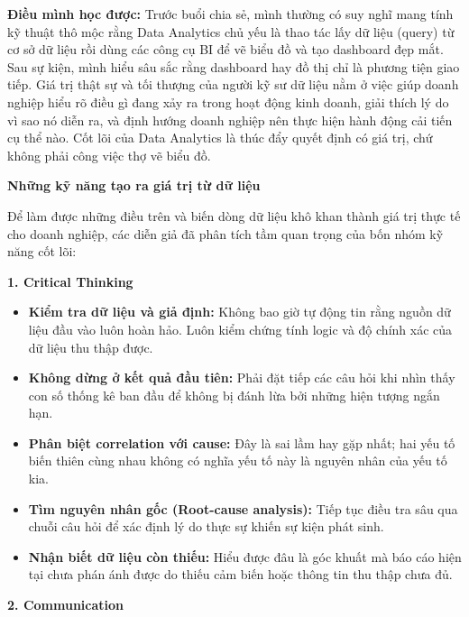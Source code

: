 \textbf{Điều mình học được:} Trước buổi chia sẻ, mình thường có suy nghĩ
mang tính kỹ thuật thô mộc rằng Data Analytics chủ yếu là thao tác lấy
dữ liệu (query) từ cơ sở dữ liệu rồi dùng các công cụ BI để vẽ biểu đồ
và tạo dashboard đẹp mắt. Sau sự kiện, mình hiểu sâu sắc rằng dashboard
hay đồ thị chỉ là phương tiện giao tiếp. Giá trị thật sự và tối thượng
của người kỹ sư dữ liệu nằm ở việc giúp doanh nghiệp hiểu rõ điều gì
đang xảy ra trong hoạt động kinh doanh, giải thích lý do vì sao nó diễn
ra, và định hướng doanh nghiệp nên thực hiện hành động cải tiến cụ thể
nào. Cốt lõi của Data Analytics là thúc đẩy quyết định có giá trị, chứ
không phải công việc thợ vẽ biểu đồ.

\vspace{0.5em}\noindent\textbf{Những kỹ năng tạo ra giá trị từ dữ
liệu}\par

Để làm được những điều trên và biến dòng dữ liệu khô khan thành giá trị
thực tế cho doanh nghiệp, các diễn giả đã phân tích tầm quan trọng của
bốn nhóm kỹ năng cốt lõi:

\vspace{0.5em}\noindent\textbf{1. Critical Thinking}\par

\begin{itemize}
\tightlist
\item
  \textbf{Kiểm tra dữ liệu và giả định:} Không bao giờ tự động tin rằng
  nguồn dữ liệu đầu vào luôn hoàn hảo. Luôn kiểm chứng tính logic và độ
  chính xác của dữ liệu thu thập được.
\item
  \textbf{Không dừng ở kết quả đầu tiên:} Phải đặt tiếp các câu hỏi khi
  nhìn thấy con số thống kê ban đầu để không bị đánh lừa bởi những hiện
  tượng ngắn hạn.
\item
  \textbf{Phân biệt correlation với cause:} Đây là sai lầm hay gặp nhất;
  hai yếu tố biến thiên cùng nhau không có nghĩa yếu tố này là nguyên
  nhân của yếu tố kia.
\item
  \textbf{Tìm nguyên nhân gốc (Root-cause analysis):} Tiếp tục điều tra
  sâu qua chuỗi câu hỏi để xác định lý do thực sự khiến sự kiện phát
  sinh.
\item
  \textbf{Nhận biết dữ liệu còn thiếu:} Hiểu được đâu là góc khuất mà
  báo cáo hiện tại chưa phán ánh được do thiếu cảm biến hoặc thông tin
  thu thập chưa đủ.
\end{itemize}

\vspace{0.5em}\noindent\textbf{2. Communication}\par

